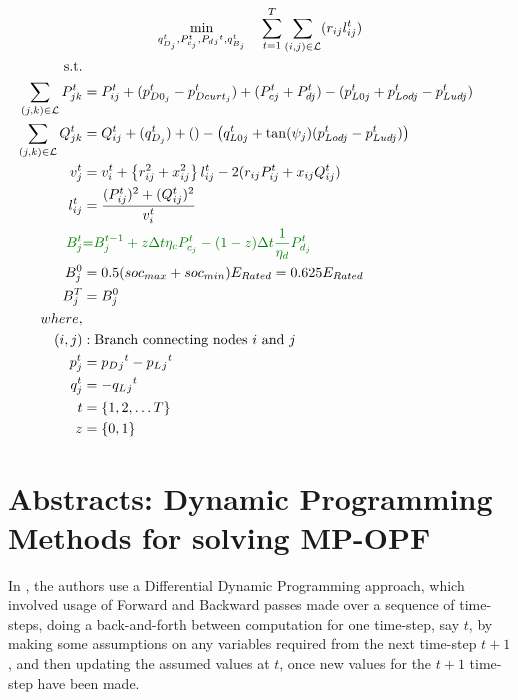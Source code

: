 \begin{gather}
    \min_{q_{D_j}^t,
	P_{c_j}^t, P_d{_j}^t, q_{B_j}^t} \quad
	\sum_{t = 1}^{T} \sum_{(i, j) \in \mathcal{L}} (r_{ij}l_{ij}^t) \\
	\begin{align}
		\text{s.t.} & {}\nonumber \\
		{ \sum_{(j, k) \in \mathcal{L}} P^t_{jk} } &= {P_{ij}^t  + (p^t_{D0_j} - p^t_{Dcurt_j} ) + (P^t_{cj} + P^t_{dj}) - (p^t_{L0j} + p^t_{Lodj} - p^t_{Ludj} ) } && \\
		{ \sum_{(j, k) \in \mathcal{L}} Q^t_{jk} } &= {Q_{ij}^t  + (q^t_{D_j}) + () - \left(q^t_{L0j} + \tan(\psi_j)(p^t_{Lodj} - p^t_{Ludj}) \right) } && \\
		{v_j^t} & = {v_{i}^t +  \left\{r_{ij}^2 + x_{ij}^2\right\}l_{ij}^t - 2(r_{ij}P_{ij}^t + x_{ij}Q_{ij}^t)} && \\
		{l_{ij}^t} & = {\frac{(P_{ij}^{t})^2 + (Q_{ij}^{t})^2}{v_i^t}} \\
		{\color{darkgreen}{ B_{j}^{t} }} &\color{darkgreen}{=} { \color{darkgreen}{ B_{j}^{t-1} + z \Delta t  \eta_c P_{c_j}^t - (1-z) \Delta t\frac{1}{\eta_d} P_{d_j}^t } } \\
		{ B_{j}^{0} } &= { 0.5(soc_{max}+soc_{min})E_{Rated} = 0.625E_{Rated}} \\
		{ B_{j}^{T} } &= { B_{j}^{0}} \\
		{where,} & {} \\
		{(i, j)} &: {\text{Branch connecting nodes $i$ and $j$}} \\
		{p_j^t} &= {p_D{_j}^t - p_L{_j}^t} \\
		{q_j^t} &= {-q_L{_j}^t} \\
		{t} &= {\{1, 2, \ldots T\}} \\
		{z} &= {\{0, 1\}}
	\end{align}
\end{gather}

\chapter{Abstracts: Dynamic Programming Methods for solving MP-OPF}

In \cite{ddp_sugar_01}, the authors use a Differential Dynamic Programming approach, which involved usage of Forward and Backward passes made over a sequence of time-steps, doing a back-and-forth between computation for one time-step, say $t$, by making some assumptions on any variables required from the next time-step $t+1$, and then updating the assumed values at $t$, once new values for the $t+1$ time-step have been made.


